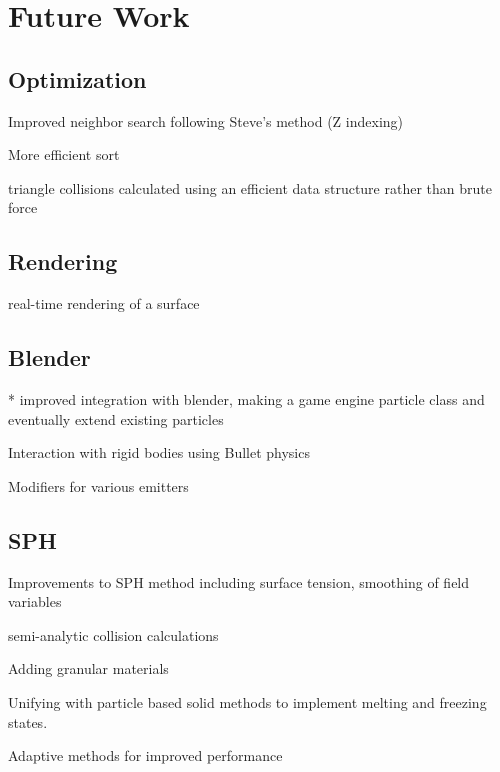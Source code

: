 \chapter{Future Work}

\section{Optimization}
Improved neighbor search following Steve's method (Z indexing)


More efficient sort


triangle collisions calculated using an efficient data structure rather than brute force


\section{Rendering}
real-time rendering of a surface


\section{Blender}
* improved integration with blender, making a game engine particle class and
eventually extend existing particles


Interaction with rigid bodies using Bullet physics


Modifiers for various emitters


\section{SPH}
Improvements to SPH method including surface tension, smoothing of field variables


semi-analytic collision calculations

Adding granular materials


Unifying with particle based solid methods to implement melting and freezing states.


Adaptive methods for improved performance



